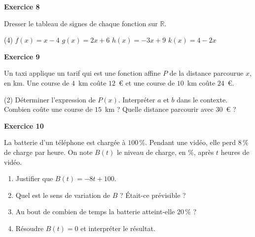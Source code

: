 \documentclass[a4paper,11pt]{article}
\newenvironment{exercice}[1]{%
  \Needspace{6\baselineskip}\par\bigskip\noindent\textbf{Exercice #1}\par\smallskip\noindent\ignorespaces
}{%
  \par
}
\begin{document}
\begin{exercice}{8}
Dresser le tableau de signes de chaque fonction sur $\mathbb{R}$.
\begin{tasks}(4)
\task $f(x)=x-4$
\task $g(x)=2x+6$
\task $h(x)=-3x+9$
\task $k(x)=4-2x$
\end{tasks}
\end{exercice}

\begin{exercice}{9}
Un taxi applique un tarif qui est une fonction affine $P$ de la distance parcourue $x$, en km.
Une course de $4$~km coûte $12$~€ et une course de $10$~km coûte $24$~€.
\begin{tasks}(2)
\task Déterminer l'expression de $P(x)$.
\task Interpréter $a$ et $b$ dans le contexte.
\task Combien coûte une course de $15$~km ?
\task Quelle distance parcourir avec $30$~€ ?
\end{tasks}
\end{exercice}

\begin{exercice}{10}
La batterie d'un téléphone est chargée à $100\,\%$. Pendant une vidéo, elle perd $8\,\%$ de charge par heure.
On note $B(t)$ le niveau de charge, en \%, après $t$ heures de vidéo.
\begin{enumerate}[label=\arabic*.]
\item Justifier que $B(t)=-8t+100$.
\item Quel est le sens de variation de $B$ ? Était-ce prévisible ?
\item Au bout de combien de temps la batterie atteint-elle $20\,\%$ ?
\item Résoudre $B(t)=0$ et interpréter le résultat.
\end{enumerate}
\end{exercice}
\end{document}
